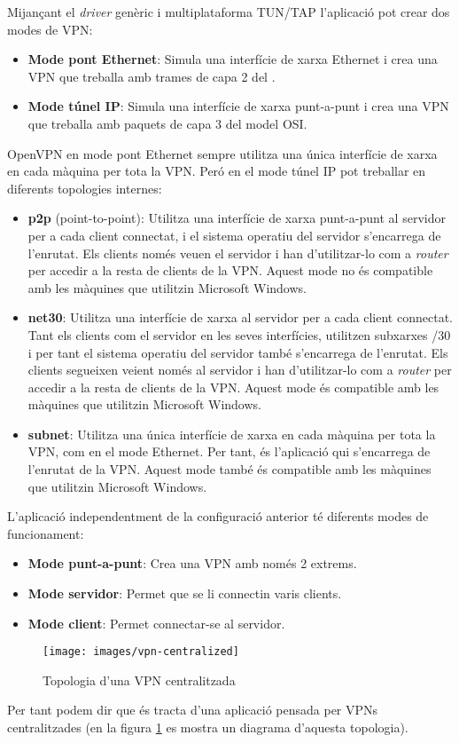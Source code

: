 Mijançant el \emph{driver} genèric i multiplataforma TUN/TAP l'aplicació pot crear dos modes de VPN:
\begin{itemize}
\item \textbf{Mode pont Ethernet}:
Simula una interfície de xarxa Ethernet i crea una VPN que treballa amb trames de capa 2 del .
\item \textbf{Mode túnel IP}:
Simula una interfície de xarxa punt-a-punt i crea una VPN que treballa amb paquets de capa 3 del model OSI.
\end{itemize}

OpenVPN en mode pont Ethernet sempre utilitza una única interfície de xarxa en cada màquina per tota la VPN. Peró en el mode túnel IP pot treballar \cite{openvpn-man} en diferents topologies internes:
\begin{itemize}
\item \textbf{p2p} (point-to-point): Utilitza una interfície de xarxa punt-a-punt al servidor per a cada client connectat, i el sistema operatiu del servidor s'encarrega de l'enrutat. Els clients només veuen el servidor i han d'utilitzar-lo com a \emph{router} per accedir a la resta de clients de la VPN. Aquest mode no és compatible amb les màquines que utilitzin Microsoft Windows.
\item \textbf{net30}: Utilitza una interfície de xarxa al servidor per a cada client connectat. Tant els clients com el servidor en les seves interfícies, utilitzen subxarxes /30 i per tant el sistema operatiu del servidor també s'encarrega de l'enrutat. Els clients segueixen veient només al servidor i han d'utilitzar-lo com a \emph{router} per accedir a la resta de clients de la VPN. Aquest mode és compatible amb les màquines que utilitzin Microsoft Windows.
\item \textbf{subnet}: Utilitza una única interfície de xarxa en cada màquina per tota la VPN, com en el mode Ethernet. Per tant, és l'aplicació qui s'encarrega de l'enrutat de la VPN. Aquest mode també és compatible amb les màquines que utilitzin Microsoft Windows.
\end{itemize}

L'aplicació independentment de la configuració anterior té diferents modes de funcionament:
\begin{itemize}
\item \textbf{Mode punt-a-punt}: Crea una VPN amb només 2 extrems.
\item \textbf{Mode servidor}: Permet que se li connectin varis clients.
\item \textbf{Mode client}: Permet connectar-se al servidor.
\end{itemize}
\begin{figure}[htb]
\centering
\texttt{[image: images/vpn-centralized]}
\caption{Topologia d'una VPN centralitzada}
\label{F:vpn-centralized}
\end{figure}
Per tant podem dir que és tracta d'una aplicació pensada per VPNs centralitzades (en la figura \ref{F:vpn-centralized} es mostra un diagrama d'aquesta topologia).

